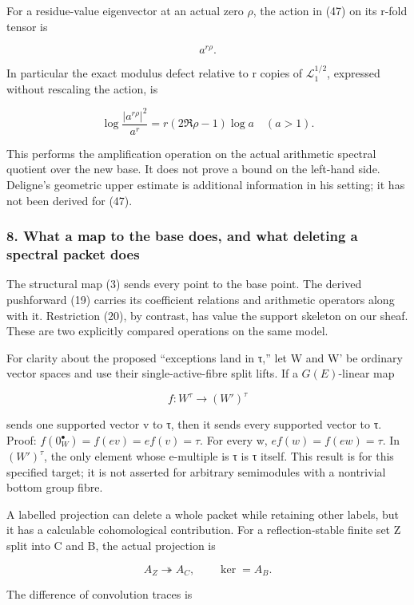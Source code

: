 \documentclass{article}
\begin{document}
For a residue-value eigenvector at an actual zero \(\rho\), the action in (47) on its r-fold tensor is

\[
a^{r\rho}.
\tag{49}
\]

In particular the exact modulus defect relative to r copies of \(\mathcal L_1^{1/2}\), expressed without rescaling the action, is

\[
\log\frac{|a^{r\rho}|^2}{a^r}
=r(2\Re\rho-1)\log a\quad(a>1).
\tag{50}
\]

This performs the amplification operation on the actual arithmetic spectral quotient over the new base. It does not prove a bound on the left-hand side. Deligne's geometric upper estimate is additional information in his setting; it has not been derived for (47).

\subsubsection{8. What a map to the base does, and what deleting a spectral packet does}\label{endpoint-tau_base--what-a-map-to-the-base-does-and-what-deleting-a-spectral-packet-does}

The structural map (3) sends every point to the base point. The derived pushforward (19) carries its coefficient relations and arithmetic operators along with it. Restriction (20), by contrast, has value the support skeleton on our sheaf. These are two explicitly compared operations on the same model.

For clarity about the proposed ``exceptions land in τ,'' let W and W' be ordinary vector spaces and use their single-active-fibre split lifts. If a \(G(E)\)-linear map

\[
f:W^\tau\to(W')^\tau
\]

sends one supported vector v to τ, then it sends every supported vector to τ. Proof: \(f(0_W^\bullet)=f(ev)=ef(v)=\tau\). For every w, \(ef(w)=f(ew)=\tau\). In \((W')^\tau\), the only element whose e-multiple is τ is τ itself. This result is for this specified target; it is not asserted for arbitrary semimodules with a nontrivial bottom group fibre.

A labelled projection can delete a whole packet while retaining other labels, but it has a calculable cohomological contribution. For a reflection-stable finite set Z split into C and B, the actual projection is

\[
A_Z\twoheadrightarrow A_C,\qquad\ker=A_B.
\tag{51}
\]

The difference of convolution traces is
\end{document}
